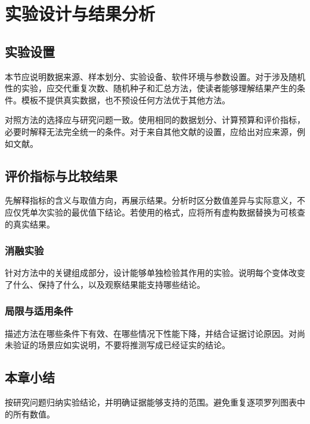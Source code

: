 \chapter{实验设计与结果分析}
\label{chap:results}
\section{实验设置}
本节应说明数据来源、样本划分、实验设备、软件环境与参数设置。对于涉及随机性的实验，应交代重复次数、随机种子和汇总方法，使读者能够理解结果产生的条件。模板不提供真实数据，也不预设任何方法优于其他方法。

对照方法的选择应与研究问题一致。使用相同的数据划分、计算预算和评价指标，必要时解释无法完全统一的条件。对于来自其他文献的设置，应给出对应来源，例如文献\cite{example-conference}。
\section{评价指标与比较结果}
先解释指标的含义与取值方向，再展示结果。分析时区分数值差异与实际意义，不应仅凭单次实验的最优值下结论。若使用的格式，应将所有虚构数据替换为可核查的真实结果。
\subsection{消融实验}
针对方法中的关键组成部分，设计能够单独检验其作用的实验。说明每个变体改变了什么、保持了什么，以及观察结果能支持哪些结论。
\subsection{局限与适用条件}
描述方法在哪些条件下有效、在哪些情况下性能下降，并结合证据讨论原因。对尚未验证的场景应如实说明，不要将推测写成已经证实的结论。
\section{本章小结}
按研究问题归纳实验结论，并明确证据能够支持的范围。避免重复逐项罗列图表中的所有数值。
